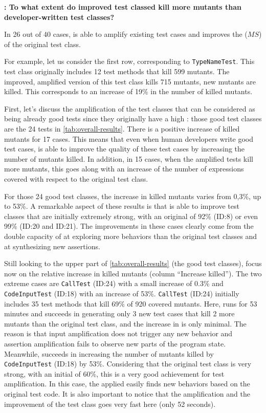 \textbf{\rqeffectiveness: To what extent do improved test classed kill more mutants than developer-written test classes?}

In 26 out of 40 cases, \dspot is able to amplify existing test cases and improves the \ms ($MS$) of the original test class.

For example, let us consider the first row, corresponding to \texttt{TypeNameTest}. 
This test class originally includes 12 test methods that kill 599 mutants. 
The improved, amplified version of this test class kills 715 mutants,  new mutants are killed.
This corresponds to an increase of 19\% in the number of killed mutants.

First, let's discuss the amplification of the test classes that can be considered as being already good tests since they originally have a high \ms:
those good test classes are the 24 tests in \autoref{tab:overall-results}.
There is a positive increase of killed mutants for 17 cases.
This means that even when human developers write good test cases, \dspot is able to improve the quality of these test cases by increasing the number of mutants killed. 
In addition, in 15 cases, when the amplified tests kill more mutants, this goes along with an increase of the number of expressions covered with respect to the original test class.

For those 24 good test classes, the increase in killed mutants varies from 0,3\%, up to 53\%.
A remarkable aspect of these results is that \dspot is able to improve test classes that are initially extremely strong, with an original \ms of 92\% (ID:8) or even 99\% (ID:20 and ID:21). 
The improvements in these cases clearly come from the double capacity of \dspot at exploring more behaviors than the original test classes and at synthesizing new assertions.

Still looking to the upper part of \autoref{tab:overall-results} (the good test classes), focus now on the relative increase in killed mutants (column ``Increase killed''). 
The two extreme cases are \texttt{CallTest} (ID:24) with a small increase of 0.3\% and \texttt{CodeInputTest} (ID:18) with an increase of 53\%.
\texttt{CallTest} (ID:24) initially includes 35 test methods that kill 69\% of 920 covered mutants. 
Here, \dspot runs for 53 minutes and succeeds in generating only 3 new test cases that kill 2 more mutants than the original test class, and the increase in \ms is only minimal. 
The reason is that input amplification does not trigger any new behavior and assertion amplification fails to observe new parts of the program state. 
Meanwhile, \dspot succeeds in increasing the number of mutants killed by \texttt{CodeInputTest} (ID:18) by 53\%.
Considering that the original test class is very strong, with an initial \ms of 60\%, this is a very good achievement for test amplification. 
In this case, the \Iampl applied easily finds new behaviors based on the original test code.
It is also important to notice that the amplification and the improvement of the test class goes very fast here (only 52 seconds). 

